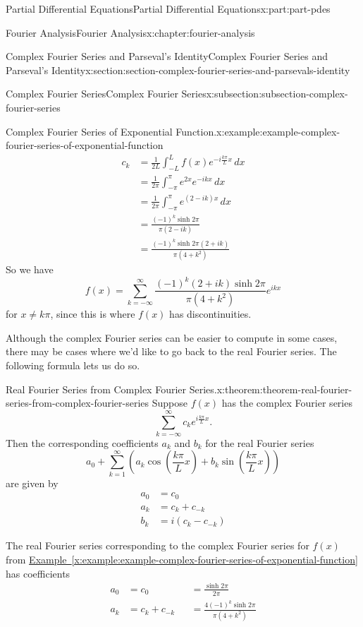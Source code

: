 \documentclass[oneside,10pt,]{book}
\newcommand{\xreffont}{\relax}
\numberwithin{equation}{part}
\newcommand{\amp}{&}
\begin{document}
\begin{partptx}{Partial Differential Equations}{}{Partial Differential Equations}{}{}{x:part:part-pdes}
\begin{chapterptx}{Fourier Analysis}{}{Fourier Analysis}{}{}{x:chapter:fourier-analysis}
\begin{sectionptx}{Complex Fourier Series and Parseval's Identity}{}{Complex Fourier Series and Parseval's Identity}{}{}{x:section:section-complex-fourier-series-and-parsevals-identity}
\begin{subsectionptx}{Complex Fourier Series}{}{Complex Fourier Series}{}{}{x:subsection:subsection-complex-fourier-series}
\begin{example}{Complex Fourier Series of Exponential Function.}{x:example:example-complex-fourier-series-of-exponential-function}
\begin{align*}
c_{k} \amp = \frac{1}{2L}\int_{-L}^{L}f(x)e^{-i\frac{k\pi}{L}x}\,dx\\
\amp = \frac{1}{2\pi}\int_{-\pi}^{\pi}e^{2x}e^{-ikx}\,dx \\
\amp = \frac{1}{2\pi}\int_{-\pi}^{\pi}e^{(2-ik)x}\,dx \\
\amp = \frac{(-1)^{k}\sinh2\pi}{\pi(2-ik)} \\
\amp = \frac{(-1)^{k}\sinh2\pi(2+ik)}{\pi(4+k^{2})}
\end{align*}
So we have%
\begin{equation*}
f(x) = \sum_{k=-\infty}^{\infty}\frac{(-1)^{k}(2+ik)\sinh2\pi}{\pi(4+k^{2})}e^{ikx}
\end{equation*}
for \(x\neq k\pi\), since this is where \(f(x)\) has discontinuities.%
\end{example}
Although the complex Fourier series can be easier to compute in some cases, there may be cases where we'd like to go back to the real Fourier series. The following formula lets us do so.%
\begin{theorem}{Real Fourier Series from Complex Fourier Series.}{}{x:theorem:theorem-real-fourier-series-from-complex-fourier-series}%
%
Suppose \(f(x)\) has the complex Fourier series%
\begin{equation*}
\sum_{k=-\infty}^{\infty}c_{k}e^{i\frac{k\pi}{L}x}.
\end{equation*}
Then the corresponding coefficients \(a_{k}\) and \(b_{k}\) for the real Fourier series%
\begin{equation*}
a_{0} + \sum_{k=1}^{\infty}\left(a_{k}\cos\left(\frac{k\pi}{L}x\right)+b_{k}\sin\left(\frac{k\pi}{L}x\right)\right)
\end{equation*}
are given by%
\begin{align*}
a_{0} \amp = c_{0} \\
a_{k} \amp = c_{k} + c_{-k} \\
b_{k} \amp = i(c_{k}-c_{-k}) 
\end{align*}
%
\end{theorem}
The real Fourier series corresponding to the complex Fourier series for \(f(x)\) from \hyperref[x:example:example-complex-fourier-series-of-exponential-function]{Example~{\xreffont\ref{x:example:example-complex-fourier-series-of-exponential-function}}} has coefficients%
\begin{align*}
a_{0} \amp = c_{0} \amp \amp= \frac{\sinh2\pi}{2\pi} \\
a_{k} \amp = c_{k} + c_{-k} \amp \amp= \frac{4(-1)^{k}\sinh2\pi}{\pi(4+k^{2})} \\

\end{align*}
\end{subsectionptx}
\end{sectionptx}
\end{chapterptx}
\end{partptx}
\end{document}
